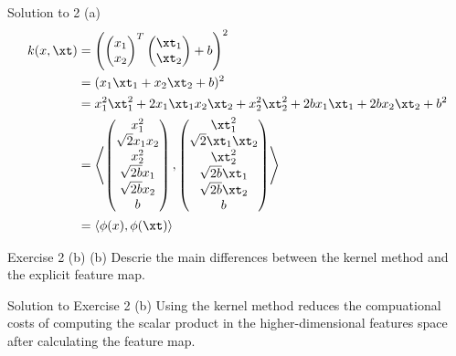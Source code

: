 \documentclass[aspectratio=169]{beamer}
\begin{document}
\begin{frame}{Solution to 2 (a)}
	\begin{align*}
		k(x, \xt) &= 
		\left( 
			\begin{pmatrix}
				x_1 \\
				x_2
			\end{pmatrix}^T 
			\begin{pmatrix}
				\xt_1 \\
				\xt_2 \\
			\end{pmatrix}
			+ b 
		\right)^2 \\
		&= (x_1 \xt_1 + x_2 \xt_2 + b)^2 \\
		&= x_1^2 \xt_1^2 + 2 x_1 \xt_1 x_2 \xt_2 + x_2^2 \xt_2^2 + 2b x_1 \xt_1 + 2b x_2 \xt_2 + b^2 \\
		&= \left \langle 
			\begin{pmatrix}
				x_1^2 \\
				\sqrt{2} x_1 x_2 \\
				x_2^2 \\
				\sqrt{2b} x_1 \\
				\sqrt{2b} x_2 \\
				b \\
			\end{pmatrix}, 
			\begin{pmatrix}
				\xt_1^2 \\
				\sqrt{2} \xt_1 \xt_2 \\
				\xt_2^2 \\
				\sqrt{2b} \xt_1 \\
				\sqrt{2b} \xt_2 \\
				b \\
			\end{pmatrix} 
			\right \rangle \\
			&= \langle \phi(x), \phi(\xt) \rangle
	\end{align*}
\end{frame}

\begin{frame}{Exercise 2 (b)}
	(b) Descrie the main differences between the kernel method and the explicit feature map.
\end{frame}


\begin{frame}{Solution to Exercise 2 (b)}
	Using the kernel method reduces the compuational costs of computing the scalar product in the higher-dimensional features space after calculating the feature map.
\end{frame}
\end{document}

